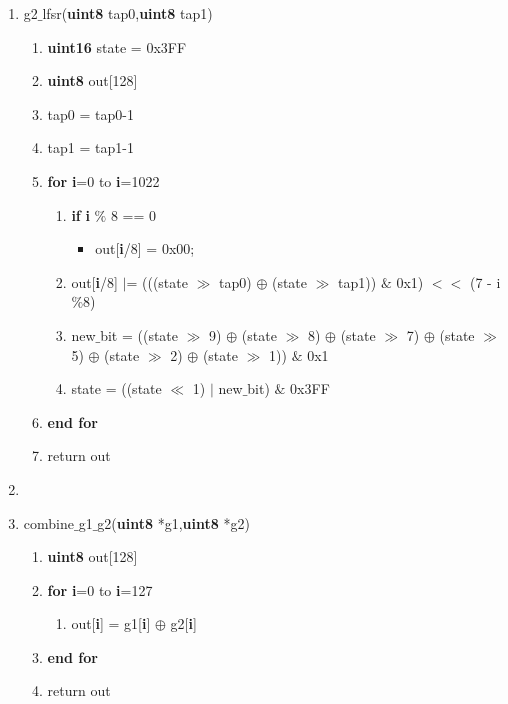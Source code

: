 \documentclass[journal,10pt,onecolumn]{article}
\begin{document}
\begin{enumerate}
\begin{enumerate}
    \item g2$\_$lfsr(\textbf{uint8} tap0,\textbf{uint8} tap1)
    \begin{enumerate}
        \item[] \textbf{uint16} state = 0x3FF
        \item[] \textbf{uint8}  out[128]
        \item[] tap0 = tap0-1
        \item[] tap1 = tap1-1 
        \item[] \textbf{for} \textbf{i}=0 to \textbf{i}=1022
        \begin{enumerate}
            \item[] \textbf{if} \textbf{i} $\%$ 8 == 0
            \begin{itemize}
                \item[] out[\textbf{i}/8] = 0x00; 
            \end{itemize}
            \item[] out[\textbf{i}/8] $|$= (((state $\gg$ tap0) $\oplus$ (state $\gg$ tap1)) $\&$ 0x1) $<<$ (7 - i$\%$8)
            \item[] new$\_$bit =  ((state $\gg$ 9) $\oplus$ (state $\gg$ 8) $\oplus$
            (state $\gg$ 7) $\oplus$ (state $\gg$ 5) $\oplus$
            (state $\gg$ 2) $\oplus$ (state $\gg$ 1)) $\&$ 0x1
            \item[] state = ((state $\ll$ 1) $\vert$ new$\_$bit) $\&$ 0x3FF
        \end{enumerate}
        \item[] \textbf{end for}
        \item[] return out
    \end{enumerate}
    

    \item[]
    \item combine$\_$g1$\_$g2(\textbf{uint8} *g1,\textbf{uint8} *g2)
    \begin{enumerate}
        \item[] \textbf{uint8} out[128]
        \item[] \textbf{for} \textbf{i}=0 to \textbf{i}=127
        \begin{enumerate}
            \item[] out[\textbf{i}] = g1[\textbf{i}] $\oplus$ g2[\textbf{i}]
        \end{enumerate}
        \item[]  \textbf{end for}
        \item[]  return out
    \end{enumerate}
    


\end{enumerate}
\end{enumerate}
\end{document}
